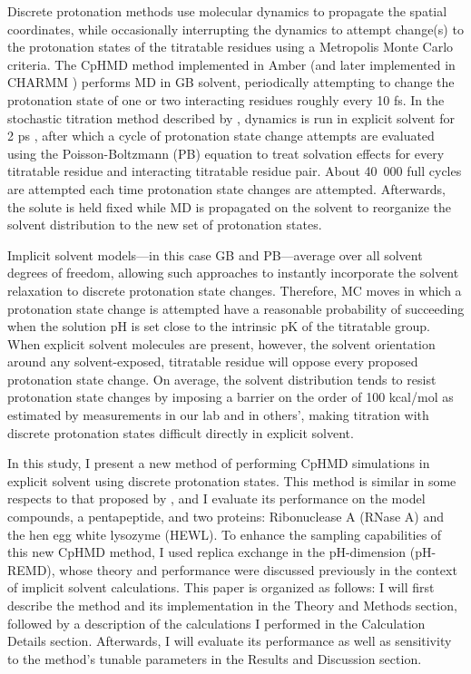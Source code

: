 Discrete protonation methods use molecular dynamics to propagate the spatial
coordinates, while occasionally interrupting the dynamics to attempt change(s)
to the protonation states of the titratable residues using a Metropolis Monte
Carlo criteria. The CpHMD method implemented in Amber
\cite{Mongan_JComputChem_2004_v25_p2038} (and later implemented in CHARMM
\cite{Itoh_Proteins_2011_v79_p3420}) performs MD in GB solvent, periodically
attempting to change the protonation state of one or two interacting residues
roughly every 10 fs. \cite{Mongan_JComputChem_2004_v25_p2038} In the stochastic
titration method described by \citeauthor{Baptista_JChemPhys_2002_v117_p4184},
dynamics is run in explicit solvent for 2 ps
\cite{Machuqueiro_Proteins_2008_v72_p289}, after which a cycle of protonation
state change attempts are evaluated using the Poisson-Boltzmann (PB) equation to
treat solvation effects for every titratable residue and interacting titratable
residue pair.  About \mbox{40 000} full cycles are attempted each time
protonation state changes are attempted.
\cite{Baptista_JPhysChemB_2001_v105_p293} Afterwards, the solute is held fixed
while MD is propagated on the solvent to reorganize the solvent distribution to
the new set of protonation states.

Implicit solvent models---in this case GB and PB---average over all solvent
degrees of freedom, allowing such approaches to instantly incorporate the
solvent relaxation to discrete protonation state changes. Therefore, MC moves in
which a protonation state change is attempted have a reasonable probability of
succeeding when the solution pH is set close to the intrinsic pK of the
titratable group. When explicit solvent molecules are present, however, the
solvent orientation around any solvent-exposed, titratable residue will oppose
every proposed protonation state change. On average, the solvent distribution
tends to resist protonation state changes by imposing a barrier on the order of
100 kcal/mol as estimated by measurements in our lab and in others',
\cite{Wallace_JChemTheoryComput_2011_v7_p2617} making titration with discrete
protonation states difficult directly in explicit solvent.

In this study, I present a new method of performing CpHMD simulations in
explicit solvent using discrete protonation states.  This method is similar 
in some respects to that proposed by
\citeauthor{Baptista_JChemPhys_2002_v117_p4184},
\cite{Baptista_JChemPhys_2002_v117_p4184} and I evaluate its performance on
the model compounds, a pentapeptide, and two proteins: Ribonuclease A (RNase A)
and the hen egg white lysozyme (HEWL). To enhance the sampling capabilities of
this new CpHMD method, I used replica exchange in the pH-dimension (pH-REMD),
whose theory and performance were discussed previously in the context of
implicit solvent calculations.  \cite{Itoh_Proteins_2011_v79_p3420,
Swails_JChemTheoryComput_2012_v8_p4393} This paper is organized as follows: I
will first describe the method and its implementation in the Theory and Methods
section, followed by a description of the calculations I performed in the
Calculation Details section. Afterwards, I will evaluate its performance as
well as sensitivity to the method's tunable parameters in the Results and
Discussion section.

